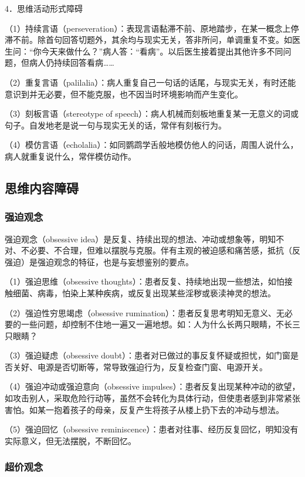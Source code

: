 4．思维活动形式障碍

（1）持续言语（perseveration）：表现言语黏滞不前、原地踏步，在某一概念上停滞不前。除首句回答切题外，其余均与现实无关，答非所问，单调重复不变。如医生问：``你今天来做什么？''病人答：``看病''。以后医生接着提出其他许多不同问题，但病人仍持续回答看病\ldots{}\ldots{}

（2）重复言语（palilalia）：病人重复自己一句话的话尾，与现实无关，有时还能意识到并无必要，但不能克服，也不因当时环境影响而产生变化。

（3）刻板言语（stereotype of
speech）：病人机械而刻板地重复某一无意义的词或句子。自发地老是说一句与现实无关的话，常伴有刻板行为。

（4）模仿言语（echolalia）：如同鹦鹉学舌般地模仿他人的问话，周围人说什么，病人就重复说什么，常伴模仿动作。

\subsection{思维内容障碍}

\subsubsection{强迫观念}

强迫观念（obsessive
idea）是反复、持续出现的想法、冲动或想象等，明知不对、不必要、不合理，但难以摆脱与克服。伴有主观的被迫感和痛苦感，抵抗（反强迫）是强迫观念的特征，也是与妄想鉴别的要点。

（1）强迫思维（obsessive
thoughts）：患者反复、持续地出现一些想法，如怕接触细菌、病毒，怕染上某种疾病，或反复出现某些淫秽或亵渎神灵的想法。

（2）强迫性穷思竭虑（obsessive
rumination）：患者反复思考明知无意义、无必要的一些问题，却控制不住地一遍又一遍地想。如：人为什么长两只眼睛，不长三只眼睛？

（3）强迫疑虑（obsessive
doubt）：患者对已做过的事反复怀疑或担忧，如门窗是否关好、电源是否切断等，常导致强迫行为，反复检查门窗、电源开关。

（4）强迫冲动或强迫意向（obsessive
impulses）：患者反复出现某种冲动的欲望，如攻击别人，采取危险行动等，虽然不会转化为具体行动，但使患者感到非常紧张害怕。如某一抱着孩子的母亲，反复产生将孩子从楼上扔下去的冲动与想法。

（5）强迫回忆（obsessive
reminiscence）：患者对往事、经历反复回忆，明知没有实际意义，但无法摆脱，不断回忆。

\subsubsection{超价观念}

